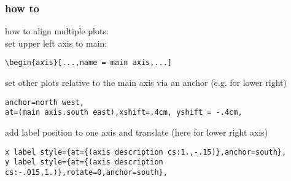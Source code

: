 
\subsubsection{how to}
how to align multiple plots: \\
set upper left axis to main:
\begin{lstlisting}
\begin{axis}[...,name = main axis,...]
\end{lstlisting}
set other plots relative to the main axis via an anchor (e.g. for lower right)
\begin{lstlisting}
anchor=north west,
at=(main axis.south east),xshift=.4cm, yshift = -.4cm,
\end{lstlisting}
add label position to one axis and translate (here for lower right axis)
\begin{lstlisting}
x label style={at={(axis description cs:1.,-.15)},anchor=south},
y label style={at={(axis description cs:-.015,1.)},rotate=0,anchor=south},
\end{lstlisting}



